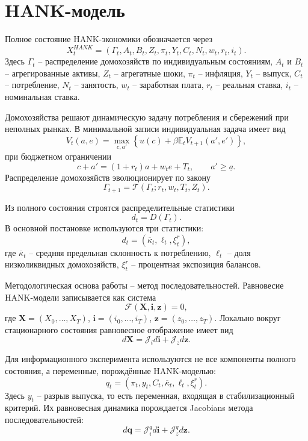 \section{HANK-модель}

Полное состояние HANK-экономики обозначается через
\[
X_t^{HANK}
=
\left(
\Gamma_t,
A_t,
B_t,
Z_t,
\pi_t,
Y_t,
C_t,
N_t,
w_t,
r_t,
i_t
\right).
\]
Здесь \(\Gamma_t\) -- распределение домохозяйств по индивидуальным состояниям, \(A_t\) и \(B_t\) -- агрегированные активы, \(Z_t\) -- агрегатные шоки, \(\pi_t\) -- инфляция, \(Y_t\) -- выпуск, \(C_t\) -- потребление, \(N_t\) -- занятость, \(w_t\) -- заработная плата, \(r_t\) -- реальная ставка, \(i_t\) -- номинальная ставка.

Домохозяйства решают динамическую задачу потребления и сбережений при неполных рынках. В минимальной записи индивидуальная задача имеет вид
\[
V_t(a,e)
=
\max_{c,a'}
\left\{
u(c)
+
\beta \mathbb E_t V_{t+1}(a',e')
\right\},
\]
при бюджетном ограничении
\[
c+a'
=
(1+r_t)a+w_t e+T_t,
\qquad
a'\geq \underline a.
\]
Распределение домохозяйств эволюционирует по закону
\[
\Gamma_{t+1}
=
\mathcal T(\Gamma_t;r_t,w_t,T_t,Z_t).
\]

Из полного состояния строятся распределительные статистики
\[
d_t=D(\Gamma_t).
\]
В основной постановке используются три статистики:
\[
d_t
=
\left(
\overline{\kappa}_t,
\ell_t,
\xi_t^r
\right),
\]
где \(\overline{\kappa}_t\) -- средняя предельная склонность к потреблению, \(\ell_t\) -- доля низколиквидных домохозяйств, \(\xi_t^r\) -- процентная экспозиция балансов.

Методологическая основа работы -- метод последовательностей. Равновесие HANK-модели записывается как система
\[
\mathcal F(\mathbf X,\mathbf i,\mathbf z)=0,
\]
где \(\mathbf X=(X_0,\ldots,X_T)\), \(\mathbf i=(i_0,\ldots,i_T)\), \(\mathbf z=(z_0,\ldots,z_T)\). Локально вокруг стационарного состояния равновесное отображение имеет вид
\[
d\mathbf X
=
\mathcal J_i d\mathbf i
+
\mathcal J_z d\mathbf z.
\]

Для информационного эксперимента используются не все компоненты полного состояния, а переменные, порождённые HANK-моделью:
\[
q_t
=
\left(
\pi_t,
y_t,
C_t,
\overline{\kappa}_t,
\ell_t,
\xi_t^r
\right).
\]
Здесь \(y_t\) -- разрыв выпуска, то есть переменная, входящая в стабилизационный критерий.
Их равновесная динамика порождается Jacobians метода последовательностей:
\[
d\mathbf q
=
\mathcal J_i^q d\mathbf i
+
\mathcal J_z^q d\mathbf z.
\]

